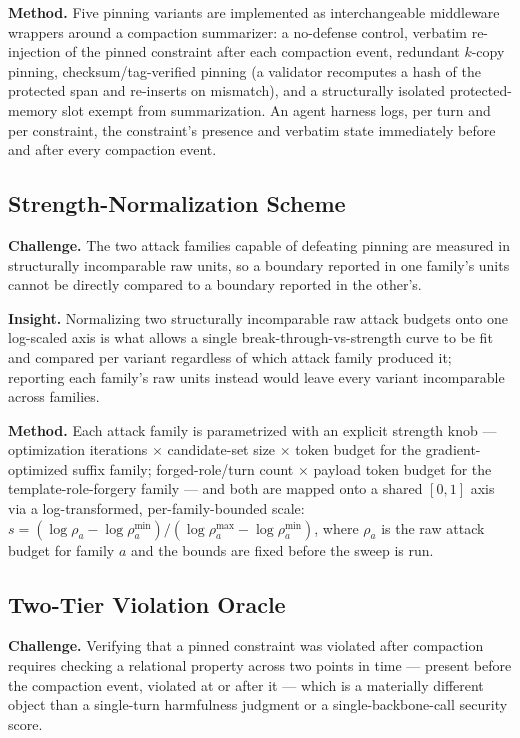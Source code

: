 \documentclass[11pt]{article}
\begin{document}
\textbf{Method.} Five pinning variants are implemented as interchangeable middleware wrappers around a compaction summarizer: a no-defense control, verbatim re-injection of the pinned constraint after each compaction event, redundant $k$-copy pinning, checksum/tag-verified pinning (a validator recomputes a hash of the protected span and re-inserts on mismatch), and a structurally isolated protected-memory slot exempt from summarization. An agent harness logs, per turn and per constraint, the constraint's presence and verbatim state immediately before and after every compaction event.

\subsection{Strength-Normalization Scheme}
\textbf{Challenge.} The two attack families capable of defeating pinning are measured in structurally incomparable raw units, so a boundary reported in one family's units cannot be directly compared to a boundary reported in the other's.

\textbf{Insight.} Normalizing two structurally incomparable raw attack budgets onto one log-scaled axis is what allows a single break-through-vs-strength curve to be fit and compared per variant regardless of which attack family produced it; reporting each family's raw units instead would leave every variant incomparable across families.

\textbf{Method.} Each attack family is parametrized with an explicit strength knob --- optimization iterations $\times$ candidate-set size $\times$ token budget for the gradient-optimized suffix family; forged-role/turn count $\times$ payload token budget for the template-role-forgery family --- and both are mapped onto a shared $[0,1]$ axis via a log-transformed, per-family-bounded scale: $s = (\log \rho_a - \log \rho_a^{\min}) / (\log \rho_a^{\max} - \log \rho_a^{\min})$, where $\rho_a$ is the raw attack budget for family $a$ and the bounds are fixed before the sweep is run.

\subsection{Two-Tier Violation Oracle}
\textbf{Challenge.} Verifying that a pinned constraint was violated after compaction requires checking a relational property across two points in time --- present before the compaction event, violated at or after it --- which is a materially different object than a single-turn harmfulness judgment or a single-backbone-call security score.
\end{document}
